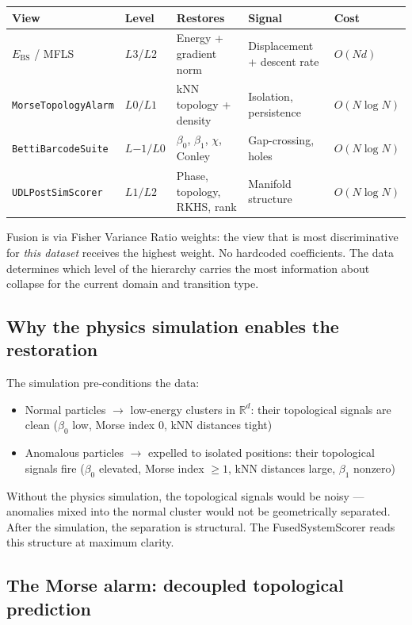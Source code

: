 \documentclass[11pt,a4paper]{article}
\theoremstyle{definition}
\begin{document}
\begin{center}
\renewcommand{\arraystretch}{1.4}
\begin{tabular}{lllll}
\toprule
\textbf{View} & \textbf{Level} & \textbf{Restores} & \textbf{Signal} & \textbf{Cost} \\
\midrule
$E_\text{BS}$ / MFLS & $L3$/$L2$ & Energy + gradient norm & Displacement + descent rate & $O(Nd)$ \\
\texttt{MorseTopologyAlarm} & $L0/L1$ & kNN topology + density & Isolation, persistence & $O(N\log N)$ \\
\texttt{BettiBarcodeSuite} & $L{-1}/L0$ & $\beta_0$, $\beta_1$, $\chi$, Conley & Gap-crossing, holes & $O(N\log N)$ \\
\texttt{UDLPostSimScorer} & $L1/L2$ & Phase, topology, RKHS, rank & Manifold structure & $O(N\log N)$ \\
\bottomrule
\end{tabular}
\end{center}

\noindent
Fusion is via Fisher Variance Ratio weights:
the view that is most discriminative for \emph{this dataset} receives the
highest weight.
No hardcoded coefficients.
The data determines which level of the hierarchy carries the most information
about collapse for the current domain and transition type.

\subsection{Why the physics simulation enables the restoration}

The simulation pre-conditions the data:
\begin{itemize}
\item Normal particles $\to$ low-energy clusters in $\mathbb{R}^d$:
  their topological signals are clean ($\beta_0$ low, Morse index 0,
  kNN distances tight)
\item Anomalous particles $\to$ expelled to isolated positions:
  their topological signals fire ($\beta_0$ elevated, Morse index $\geq 1$,
  kNN distances large, $\beta_1$ nonzero)
\end{itemize}

Without the physics simulation, the topological signals would be noisy ---
anomalies mixed into the normal cluster would not be geometrically separated.
After the simulation, the separation is structural.
The FusedSystemScorer reads this structure at maximum clarity.

\subsection{The Morse alarm: decoupled topological prediction}
\end{document}
